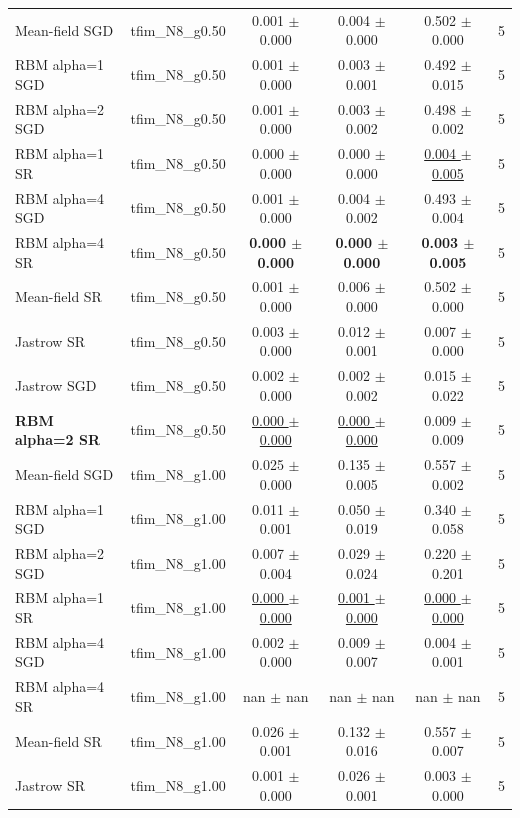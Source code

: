 \begin{tabular}{llcccc}
\midrule
Mean-field SGD & tfim\_N8\_g0.50 & 0.001 $\pm$ 0.000 & 0.004 $\pm$ 0.000 & 0.502 $\pm$ 0.000 & 5 \\
RBM alpha=1 SGD & tfim\_N8\_g0.50 & 0.001 $\pm$ 0.000 & 0.003 $\pm$ 0.001 & 0.492 $\pm$ 0.015 & 5 \\
RBM alpha=2 SGD & tfim\_N8\_g0.50 & 0.001 $\pm$ 0.000 & 0.003 $\pm$ 0.002 & 0.498 $\pm$ 0.002 & 5 \\
RBM alpha=1 SR & tfim\_N8\_g0.50 & 0.000 $\pm$ 0.000 & 0.000 $\pm$ 0.000 & \underline{0.004 $\pm$ 0.005} & 5 \\
RBM alpha=4 SGD & tfim\_N8\_g0.50 & 0.001 $\pm$ 0.000 & 0.004 $\pm$ 0.002 & 0.493 $\pm$ 0.004 & 5 \\
RBM alpha=4 SR & tfim\_N8\_g0.50 & \textbf{0.000 $\pm$ 0.000} & \textbf{0.000 $\pm$ 0.000} & \textbf{0.003 $\pm$ 0.005} & 5 \\
Mean-field SR & tfim\_N8\_g0.50 & 0.001 $\pm$ 0.000 & 0.006 $\pm$ 0.000 & 0.502 $\pm$ 0.000 & 5 \\
Jastrow SR & tfim\_N8\_g0.50 & 0.003 $\pm$ 0.000 & 0.012 $\pm$ 0.001 & 0.007 $\pm$ 0.000 & 5 \\
Jastrow SGD & tfim\_N8\_g0.50 & 0.002 $\pm$ 0.000 & 0.002 $\pm$ 0.002 & 0.015 $\pm$ 0.022 & 5 \\
\textbf{RBM alpha=2 SR} & tfim\_N8\_g0.50 & \underline{0.000 $\pm$ 0.000} & \underline{0.000 $\pm$ 0.000} & 0.009 $\pm$ 0.009 & 5 \\
\midrule
Mean-field SGD & tfim\_N8\_g1.00 & 0.025 $\pm$ 0.000 & 0.135 $\pm$ 0.005 & 0.557 $\pm$ 0.002 & 5 \\
RBM alpha=1 SGD & tfim\_N8\_g1.00 & 0.011 $\pm$ 0.001 & 0.050 $\pm$ 0.019 & 0.340 $\pm$ 0.058 & 5 \\
RBM alpha=2 SGD & tfim\_N8\_g1.00 & 0.007 $\pm$ 0.004 & 0.029 $\pm$ 0.024 & 0.220 $\pm$ 0.201 & 5 \\
RBM alpha=1 SR & tfim\_N8\_g1.00 & \underline{0.000 $\pm$ 0.000} & \underline{0.001 $\pm$ 0.000} & \underline{0.000 $\pm$ 0.000} & 5 \\
RBM alpha=4 SGD & tfim\_N8\_g1.00 & 0.002 $\pm$ 0.000 & 0.009 $\pm$ 0.007 & 0.004 $\pm$ 0.001 & 5 \\
RBM alpha=4 SR & tfim\_N8\_g1.00 & nan $\pm$ nan & nan $\pm$ nan & nan $\pm$ nan & 5 \\
Mean-field SR & tfim\_N8\_g1.00 & 0.026 $\pm$ 0.001 & 0.132 $\pm$ 0.016 & 0.557 $\pm$ 0.007 & 5 \\
Jastrow SR & tfim\_N8\_g1.00 & 0.001 $\pm$ 0.000 & 0.026 $\pm$ 0.001 & 0.003 $\pm$ 0.000 & 5 \\

\end{tabular}
